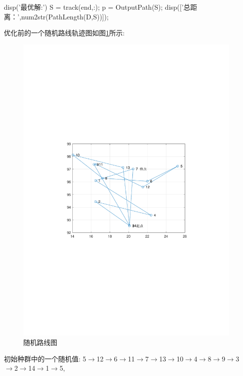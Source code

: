 \documentclass{article}
\begin{document}
\begin{homeworkProblem}
\begin{tcblisting}
 disp('最优解:')
 S = track(end,:);
 p = OutputPath(S);
 disp(['总距离：',num2str(PathLength(D,S))]);
\end{tcblisting}
    优化前的一个随机路线轨迹图如图\ref{fig:随机路线图}所示:
    \begin{figure}[H]  %
        \centering
        \includegraphics[width=0.55\linewidth]{images/title/随机路线图.pdf}
        \caption{随机路线图}
        \label{fig:随机路线图}
    \end{figure}
    初始种群中的一个随机值: 5$\to $12$\to $6$\to $11$\to $7$\to $13$\to $10$\to $4$\to $8$\to $9$\to $3$\to $2$\to $14$\to $1$\to $5, 
    

\end{homeworkProblem}
\end{document}
